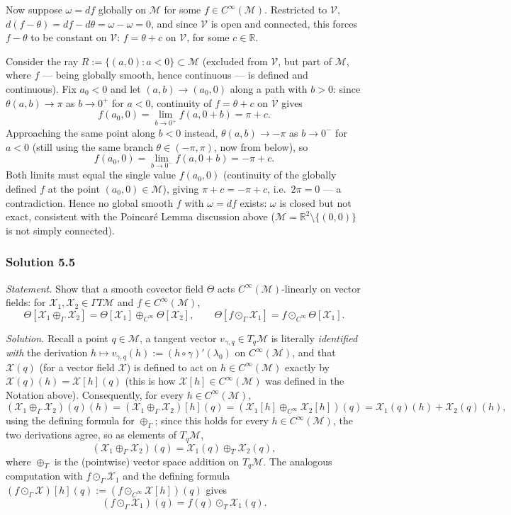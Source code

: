 \documentclass[11pt]{article}
\newcommand{\Cinf}{C^\infty(\mathcal M)}
\begin{document}
Now suppose $\omega=df$ globally on $\mathcal M$ for some $f\in\Cinf$.
Restricted to $\mathcal V$, $d(f-\theta)=df-d\theta=\omega-\omega=0$, and
since $\mathcal V$ is open and connected, this forces $f-\theta$ to be
constant on $\mathcal V$: $f=\theta+c$ on $\mathcal V$, for some
$c\in\mathbb R$.

Consider the ray $R:=\{(a,0):a<0\}\subset\mathcal M$ (excluded from
$\mathcal V$, but part of $\mathcal M$, where $f$ — being globally smooth,
hence continuous — is defined and continuous). Fix $a_0<0$ and let
$(a,b)\to(a_0,0)$ along a path with $b>0$: since $\theta(a,b)\to\pi$ as
$b\to0^+$ for $a<0$, continuity of $f=\theta+c$ on $\mathcal V$ gives
\[
f(a_0,0) = \lim_{b\to0^+}f(a,0+b) = \pi+c.
\]
Approaching the same point along $b<0$ instead, $\theta(a,b)\to-\pi$ as
$b\to0^-$ for $a<0$ (still using the same branch $\theta\in(-\pi,\pi)$, now
from below), so
\[
f(a_0,0) = \lim_{b\to0^-}f(a,0+b) = -\pi+c.
\]
Both limits must equal the single value $f(a_0,0)$ (continuity of the
globally defined $f$ at the point $(a_0,0)\in\mathcal M$), giving
$\pi+c=-\pi+c$, i.e.\ $2\pi=0$ — a contradiction. Hence no global smooth
$f$ with $\omega=df$ exists: $\omega$ is closed but not exact, consistent
with the Poincar\'e Lemma discussion above ($\mathcal M=\mathbb
R^2\setminus\{(0,0)\}$ is not simply connected).

\subsubsection*{Solution 5.5}

\noindent\textit{Statement.} Show that a smooth covector field $\Theta$
acts $\Cinf$-linearly on vector fields: for $\mathcal X_1,\mathcal
X_2\in\Gamma T\mathcal M$ and $f\in\Cinf$,
\[
\Theta[\mathcal X_1\oplus_\Gamma \mathcal X_2]=\Theta[\mathcal X_1]\oplus_{C^\infty}\Theta[\mathcal X_2],\qquad \Theta[f\odot_\Gamma \mathcal X_1]=f\odot_{C^\infty}\Theta[\mathcal X_1].
\]

\medskip
\noindent\textit{Solution.} Recall a point $q\in\mathcal M$, a tangent
vector $v_{\gamma,q}\in T_q\mathcal M$ is literally \emph{identified with}
the derivation $h\mapsto v_{\gamma,q}(h):=(h\circ\gamma)'(\lambda_0)$ on
$\Cinf$, and that $\mathcal X(q)$ (for a vector field $\mathcal X$) is
defined to act on $h\in\Cinf$ exactly by $\mathcal X(q)(h)=\mathcal
X[h](q)$ (this is how $\mathcal X[h]\in\Cinf$ was defined in the Notation
above). Consequently, for every $h\in\Cinf$,
\[
(\mathcal X_1\oplus_\Gamma\mathcal X_2)(q)(h) = (\mathcal X_1\oplus_\Gamma\mathcal X_2)[h](q) = (\mathcal X_1[h]\oplus_{C^\infty}\mathcal X_2[h])(q) = \mathcal X_1(q)(h)+\mathcal X_2(q)(h),
\]
using the defining formula for $\oplus_\Gamma$; since this holds for every
$h\in\Cinf$, the two derivations agree, so as elements of $T_q\mathcal M$,
\[
(\mathcal X_1\oplus_\Gamma\mathcal X_2)(q) = \mathcal X_1(q)\oplus_T\mathcal X_2(q),
\]
where $\oplus_T$ is the (pointwise) vector space addition on $T_q\mathcal
M$. The analogous computation with $f\odot_\Gamma\mathcal X_1$ and the
defining formula $(f\odot_\Gamma\mathcal X)[h](q):=(f\odot_{C^\infty}
\mathcal X[h])(q)$ gives
\[
(f\odot_\Gamma\mathcal X_1)(q) = f(q)\odot_T\mathcal X_1(q).
\]
\end{document}
